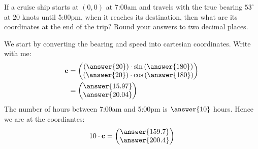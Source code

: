 \documentclass{ximera}
\author{Parisa Fatheddin \and Bart Snapp}
\begin{document}
\begin{exercise}
If a cruise ship starts at $(0,0)$ at 7:00am and travels with the
true bearing $53^\circ$ at $20$ knots until 5:00pm, when it reaches
its destination, then what are its coordinates at the end of the trip?
Round your answers to two decimal places.
\begin{prompt}
  We start by converting the bearing and speed into cartesian coordinates. Write with me:
  \begin{align*}
    \vec{c} &=
    \begin{pmatrix}
      \left(\answer{20}\right)\cdot\sin\left(\answer{180}\right)\\
      \left(\answer{20}\right)\cdot\cos\left(\answer{180}\right)
    \end{pmatrix}\\
    &=\begin{pmatrix}
      \answer{15.97} \\
    \answer{20.04}
  \end{pmatrix}
  \end{align*}
  The number of hours between 7:00am and 5:00pm is $\answer{10}$ hours.
  Hence we are at the coordiantes:
  \[
10 \cdot \vec{c} = \begin{pmatrix}
      \answer{159.7} \\
    \answer{200.4}
  \end{pmatrix}
  \]
\end{prompt}
\end{exercise}
\end{document}

